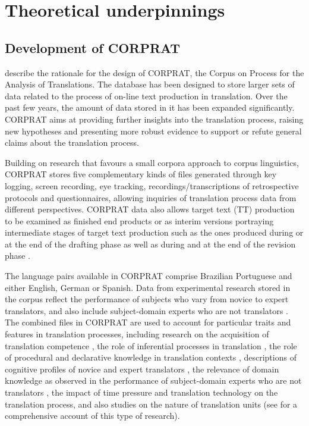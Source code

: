 \documentclass[output=paper]{LSP/langsci}
\begin{document}
\section{Theoretical underpinnings}\label{sec:alves:2}
  
\subsection{Development of CORPRAT}

\citet{PaganoEtAl2004} describe the rationale for the design of CORPRAT, the Corpus on Process for the Analysis of Translations. The database has been designed to store larger sets of data related to the process of on-line text production in translation. Over the past few years, the amount of data stored in it has been expanded significantly. CORPRAT aims at providing further insights into the translation process, raising new hypotheses and presenting more robust evidence to support or refute general claims about the translation process. 

Building on research that favours a small corpora approach \citep{GhadessyGao2001} to corpus linguistics, CORPRAT stores five complementary kinds of files generated through key logging, screen recording, eye tracking, recordings/transcriptions of retrospective protocols and questionnaires, allowing inquiries of translation process data from different perspectives. CORPRAT data also allows target text (TT) production to be examined as finished end products or as interim versions portraying intermediate stages of target text production such as the ones produced during or at the end of the drafting phase as well as during and at the end of the revision phase \citep{Jakobsen2002}. 

The language pairs available in CORPRAT comprise Brazilian Portuguese and either English, German or Spanish. Data from experimental research stored in the corpus reflect the performance of subjects who vary from novice to expert translators, and also include subject-domain experts who are not translators \citep{Pagano2008}. The combined files in CORPRAT are used to account for particular traits and features in translation processes, including research on the acquisition of translation competence \citep{AlvesGoncalves2007}, the role of inferential processes in translation \citep{AlvesGoncalves2003,Alves2007}, the role of procedural and declarative knowledge in translation contexts \citep{Alves2005a}, descriptions of cognitive profiles of novice and expert translators \citep{Alves2005b,Magalhães2006}, the relevance of domain knowledge as observed in the performance of subject-domain experts who are not translators \citep{Pagano2008}, the impact of time pressure \citep{Liparini2005} and translation technology \citep{AlvesLiparini2009} on the translation process, and also studies on the nature of translation units (see \citealt{AlvesVale2009} for a comprehensive account of this type of research).
\end{document}
